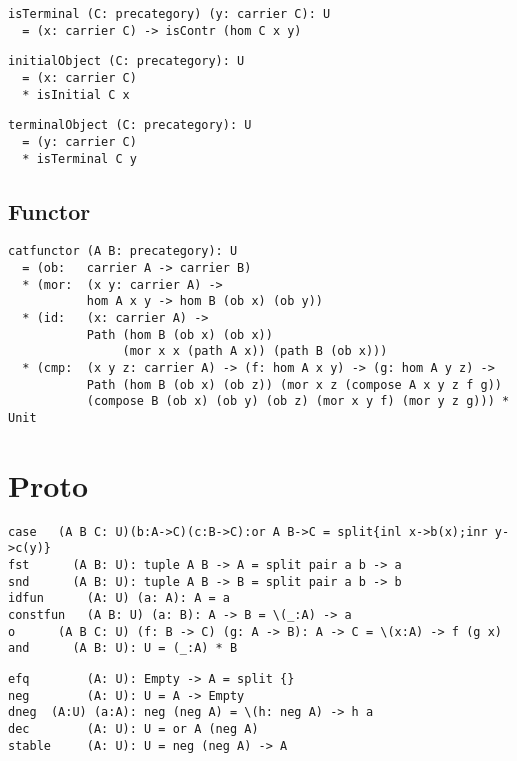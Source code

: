 \documentclass{article}
\begin{document}
\begin{lstlisting}[mathescape=true]
isTerminal (C: precategory) (y: carrier C): U
  = (x: carrier C) -> isContr (hom C x y)
\end{lstlisting}

\begin{lstlisting}[mathescape=true]
initialObject (C: precategory): U
  = (x: carrier C)
  * isInitial C x
\end{lstlisting}

\begin{lstlisting}[mathescape=true]
terminalObject (C: precategory): U
  = (y: carrier C)
  * isTerminal C y
\end{lstlisting}

\subsection{Functor}

\begin{lstlisting}[mathescape=true]
catfunctor (A B: precategory): U
  = (ob:   carrier A -> carrier B)
  * (mor:  (x y: carrier A) ->
           hom A x y -> hom B (ob x) (ob y))
  * (id:   (x: carrier A) ->
           Path (hom B (ob x) (ob x))
                (mor x x (path A x)) (path B (ob x)))
  * (cmp:  (x y z: carrier A) -> (f: hom A x y) -> (g: hom A y z) ->
           Path (hom B (ob x) (ob z)) (mor x z (compose A x y z f g))
           (compose B (ob x) (ob y) (ob z) (mor x y f) (mor y z g))) * Unit
\end{lstlisting}

\section{Proto}

\begin{lstlisting}[mathescape=true]
case   (A B C: U)(b:A->C)(c:B->C):or A B->C = split{inl x->b(x);inr y->c(y)}
fst      (A B: U): tuple A B -> A = split pair a b -> a
snd      (A B: U): tuple A B -> B = split pair a b -> b
idfun      (A: U) (a: A): A = a
constfun   (A B: U) (a: B): A -> B = \(_:A) -> a
o      (A B C: U) (f: B -> C) (g: A -> B): A -> C = \(x:A) -> f (g x)
and      (A B: U): U = (_:A) * B
\end{lstlisting}

\begin{lstlisting}[mathescape=true]
efq        (A: U): Empty -> A = split {}
neg        (A: U): U = A -> Empty
dneg  (A:U) (a:A): neg (neg A) = \(h: neg A) -> h a
dec        (A: U): U = or A (neg A)
stable     (A: U): U = neg (neg A) -> A
\end{lstlisting}
\end{document}
